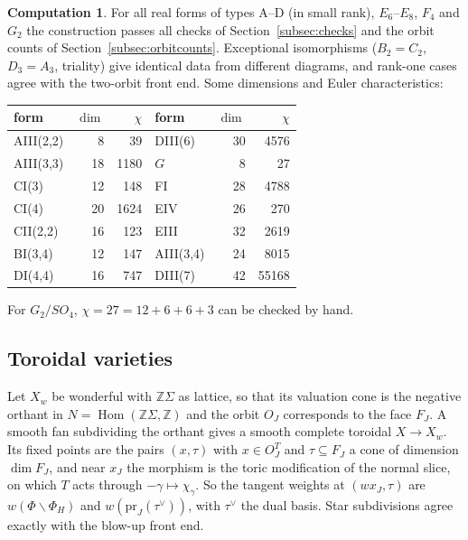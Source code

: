 \documentclass[11pt]{amsart}
\theoremstyle{definition}
\newtheorem{computation}[theorem]{Computation}
\theoremstyle{remark}
\newcommand{\ZZ}{\mathbb{Z}}
\newcommand{\pr}{\mathrm{pr}}
\begin{document}
\begin{computation}\label{comp:symmetric}
For all real forms of types A--D (in small rank), $E_6$--$E_8$, $F_4$ and
$G_2$ the construction passes all checks of
Section~\ref{subsec:checks} and the orbit counts of
Section~\ref{subsec:orbitcounts}. Exceptional isomorphisms
($B_2=C_2$, $D_3=A_3$, triality) give identical data from different
diagrams, and rank-one cases agree with the two-orbit front end. Some
dimensions and Euler characteristics:
\begin{center}
\begin{tabular}{lrr@{\qquad}lrr}
\toprule
form & $\dim$ & $\chi$ & form & $\dim$ & $\chi$\\
\midrule
AIII(2,2) & 8 & 39 & DIII(6) & 30 & 4576\\
AIII(3,3) & 18 & 1180 & $G$ & 8 & 27\\
CI(3) & 12 & 148 & FI & 28 & 4788\\
CI(4) & 20 & 1624 & EIV & 26 & 270\\
CII(2,2) & 16 & 123 & EIII & 32 & 2619\\
BI(3,4) & 12 & 147 & AIII(3,4) & 24 & 8015\\
DI(4,4) & 16 & 747 & DIII(7) & 42 & 55168\\
\bottomrule
\end{tabular}
\end{center}
For $G_2/SO_4$, $\chi = 27 = 12+6+6+3$ can be checked by hand.
\end{computation}

\subsection{Toroidal varieties}\label{subsec:toroidal}
Let $X_w$ be wonderful with $\ZZ\Sigma$ as lattice, so that its valuation
cone is the negative orthant in $N=\operatorname{Hom}(\ZZ\Sigma,\ZZ)$ and
the orbit $O_J$ corresponds to the face $F_J$. A smooth fan subdividing the
orthant gives a smooth complete toroidal $X\to X_w$. Its fixed points are
the pairs $(x,\tau)$ with $x\in O_J^T$ and $\tau\subseteq F_J$ a cone of
dimension $\dim F_J$, and near $x_J$ the morphism is the toric modification
of the normal slice, on which $T$ acts through $-\gamma\mapsto\chi_\gamma$.
So the tangent weights at $(w x_J,\tau)$ are $w(\Phi\smallsetminus\Phi_H)$ and
$w(\pr_J(\tau^\vee))$, with $\tau^\vee$ the dual basis. Star subdivisions agree
exactly with the blow-up front end.
\end{document}
